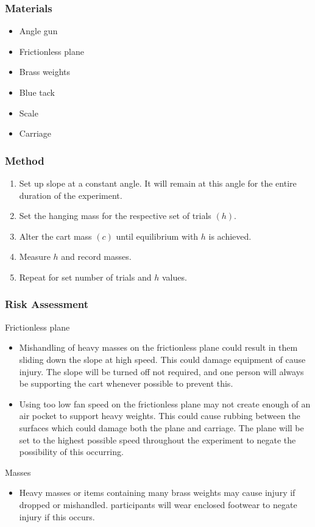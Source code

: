 \documentclass[12pt,a4paper]{article}
\begin{document}
\subsubsection{Materials}
\begin{itemize}
	\item Angle gun 
	\item Frictionless plane
	\item Brass weights
	\item Blue tack 
	\item Scale
	\item Carriage
\end{itemize}

\subsubsection{Method}
\begin{enumerate}
\item Set up slope at a constant angle. It will remain at this angle for the entire duration of the experiment. 
\item Set the hanging mass for the respective set of trials $(h)$. 
\item Alter the cart mass $(c)$ until equilibrium with $h$ is achieved.
\item Measure $h$ and record masses. 
\item Repeat for set number of trials and $h$ values.
	
	 
\end{enumerate}


\subsubsection{Risk Assessment}
Frictionless plane
\begin{itemize}
	\item Mishandling of heavy masses on the frictionless plane could result in them sliding down the slope at high speed. This could damage equipment of cause injury. The slope will be turned off not required, and one person will always be supporting the cart whenever possible to prevent this. 
	\item Using too low fan speed on the frictionless plane may not create enough of an air pocket to support heavy weights. This could cause rubbing between the surfaces which could damage both the plane and carriage. The plane will be set to the highest possible speed throughout the experiment to negate the possibility of this occurring.
\end{itemize}
Masses
\begin{itemize}
	\item Heavy masses or items containing many brass weights may cause injury if dropped or mishandled. participants will wear enclosed footwear to negate injury if this occurs.  
\end{itemize}
\end{document}
